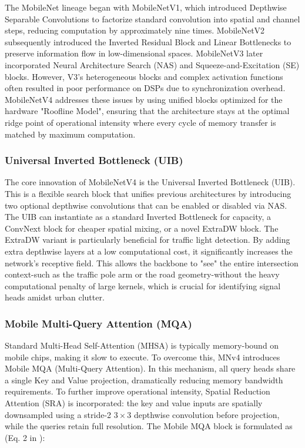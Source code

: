 The MobileNet lineage began with {MobileNetV1}, which introduced Depthwise Separable Convolutions to factorize standard convolution into spatial and channel steps, reducing computation by approximately nine times. {MobileNetV2} subsequently introduced the Inverted Residual Block and Linear Bottlenecks to preserve information flow in low-dimensional spaces. {MobileNetV3} later incorporated Neural Architecture Search (NAS) and Squeeze-and-Excitation (SE) blocks. However, V3's heterogeneous blocks and complex activation functions often resulted in poor performance on DSPs due to synchronization overhead. {MobileNetV4} addresses these issues by using unified blocks optimized for the hardware "Roofline Model", ensuring that the architecture stays at the optimal ridge point of operational intensity where every cycle of memory transfer is matched by maximum computation.

\subsubsection{Universal Inverted Bottleneck (UIB)}

The core innovation of MobileNetV4 is the Universal Inverted Bottleneck (UIB). This is a flexible search block that unifies previous architectures by introducing two optional depthwise convolutions that can be enabled or disabled via NAS. The UIB can instantiate as a standard Inverted Bottleneck for capacity, a ConvNext block for cheaper spatial mixing, or a novel ExtraDW block. The ExtraDW variant is particularly beneficial for traffic light detection. By adding extra depthwise layers at a low computational cost, it significantly increases the network's receptive field. This allows the backbone to "see" the entire intersection context-such as the traffic pole arm or the road geometry-without the heavy computational penalty of large kernels, which is crucial for identifying signal heads amidst urban clutter.

\subsubsection{Mobile Multi-Query Attention (MQA)}

Standard Multi-Head Self-Attention (MHSA) is typically memory-bound on mobile chips, making it slow to execute. To overcome this, MNv4 introduces Mobile MQA (Multi-Query Attention). In this mechanism, all query heads share a single Key and Value projection, dramatically reducing memory bandwidth requirements. To further improve operational intensity, Spatial Reduction Attention (SRA) is incorporated: the key and value inputs are spatially downsampled using a stride-2 $3\times3$ depthwise convolution before projection, while the queries retain full resolution. The Mobile MQA block is formulated as (Eq. 2 in \cite{qin2024mobilenetv4universalmodels}):

